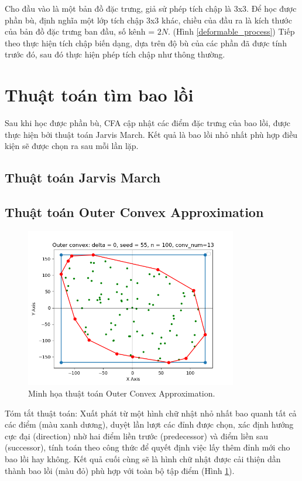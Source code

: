 \documentclass[12pt,a4paper,openany,oneside]{report}
\begin{document}
Cho đầu vào là một bản đồ đặc trưng, giả sử phép tích chập là 3x3. Để học được phần bù, định nghĩa một lớp tích chập 3x3 khác, chiều của đầu ra là kích thước của bản đồ đặc trưng ban đầu, số kênh = $2N$. (Hình \ref{deformable_process}) Tiếp theo thực hiện tích chập biến dạng, dựa trên độ bù của các phần đã được tính trước đó, sau đó thực hiện phép tích chập như thông thường.
\section{Thuật toán tìm bao lồi}
Sau khi học được phần bù, CFA cập nhật các điểm đặc trưng của bao lồi, được thực hiện bởi thuật toán Jarvis March. Kết quả là bao lồi nhỏ nhất phù hợp điều kiện sẽ được chọn ra sau mỗi lần lặp.

\subsection{Thuật toán Jarvis March}





\subsection{Thuật toán Outer Convex Approximation}
\begin{figure}[ht!]
	\begin{center}
		\includegraphics[width=350px]{./outer_convex_approximation_brief.png}
		\caption{Minh họa thuật toán Outer Convex Approximation.}
		\label{outer_convex_approximation_brief}
	\end{center}
\end{figure} 
Tóm tắt thuật toán: Xuất phát từ một hình chữ nhật nhỏ nhất bao quanh tất cả các điểm (màu xanh dương), duyệt lần lượt các đỉnh được chọn, xác định hướng cực đại (direction) nhờ hai điểm liền trước (predecessor) và điểm liền sau (successor), tính toán theo công thức để quyết định việc lấy thêm đỉnh mới cho bao lồi hay không. Kết quả cuối cùng sẽ là hình chữ nhật được cải thiện dần thành bao lồi (màu đỏ) phù hợp với toàn bộ tập điểm (Hình \ref{outer_convex_approximation_brief}). 
\end{document}
